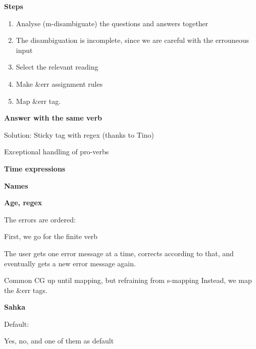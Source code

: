 \documentclass[landscape,norsk,11pt]{seminar}
\begin{document}
\begin{slide}
\newslide
\textbf{Steps}

\begin{enumerate}
\item{Analyse (m-disambiguate) the questions and answers together}
\item{The disambiguation is incomplete, since we are careful with the errouneous input}
\item{Select the relevant reading}
\item{Make \&err assignment rules}
\item{Map \&err tag.}
\end{enumerate}

\newslide
\textbf{Answer with the same verb}

Solution: Sticky tag with regex (thanks to Tino)

Exceptional handling of pro-verbs 

\newslide
\textbf{Time expressions}


\newslide
\textbf{Names}


\newslide
\textbf{Age, regex}

\newslide

The errors are ordered:

First, we go for the finite verb


The user gets one error message at a time, corrects according to that, and eventually gets a new error message again.



Common CG up until mapping, but refraining from s-mapping
Instead, we map the \&err tags.



\newslide
\textbf{Sahka}

Default:

Yes, no, and one of them as default








\end{slide}
\end{document}
